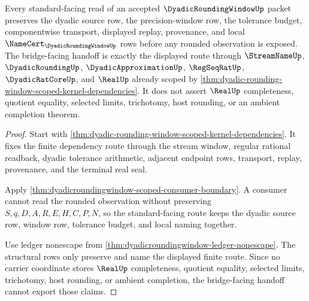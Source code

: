 \begin{theorem}
\label{thm:dyadic-rounding-window-bridge-facing-handoff}
Every standard-facing read of an accepted $\DyadicRoundingWindowUp$ packet preserves the dyadic source row, the precision-window row, the tolerance budget, componentwise transport, displayed replay, provenance, and local $\NameCert_{\DyadicRoundingWindowUp}$ rows before any rounded observation is exposed. The bridge-facing handoff is exactly the displayed route through $\StreamNameUp$, $\DyadicRoundingUp$, $\DyadicApproximationUp$, $\RegSeqRatUp$, $\DyadicRatCoreUp$, and $\RealUp$ already scoped by \autoref{thm:dyadic-rounding-window-scoped-kernel-dependencies}. It does not assert $\RealUp$ completeness, quotient equality, selected limits, trichotomy, host rounding, or an ambient completion theorem.
\end{theorem}
\begin{proof}
Start with \autoref{thm:dyadic-rounding-window-scoped-kernel-dependencies}. It fixes the finite dependency route through the stream window, regular rational readback, dyadic tolerance arithmetic, adjacent endpoint rows, transport, replay, provenance, and the terminal real seal.

Apply \autoref{thm:dyadicroundingwindow-scoped-consumer-boundary}. A consumer cannot read the rounded observation without preserving $S,q,D,A,R,E,H,C,P,N$, so the standard-facing route keeps the dyadic source row, window row, tolerance budget, and local naming together.

Use ledger nonescape from \autoref{thm:dyadicroundingwindow-ledger-nonescape}. The structural rows only preserve and name the displayed finite route. Since no carrier coordinate stores $\RealUp$ completeness, quotient equality, selected limits, trichotomy, host rounding, or ambient completion, the bridge-facing handoff cannot export those claims.
\end{proof}



